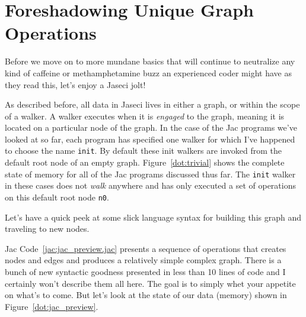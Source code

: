 \section{Foreshadowing Unique Graph Operations}
Before we move on to more mundane basics that will continue to neutralize any kind of caffeine or methamphetamine buzz an experienced \gls{coder} might have as they read this, let's enjoy a \gls{Jaseci jolt}!
\par
As described before, all data in Jaseci lives in either a graph, or within the scope of a \gls{walker}. A walker executes when it is \emph{engaged} to the graph, meaning it is located on a particular node of the graph. In the case of the Jac programs we've looked at so far, each program has specified one walker for which I've happened to choose the name \texttt{init}. By default these init walkers are invoked from the default root node of an empty graph. Figure~\ref{dot:trivial} shows the complete state of memory for all of the Jac programs discussed thus far. The \texttt{init} walker in these cases does not \emph{walk} anywhere and has only executed a set of operations on this default root node \texttt{n0}.
\par
Let's have a quick peek at some slick language syntax for building this graph and traveling to new nodes.
\par
{}
\par
{}
Jac Code~\ref{jac:jac_preview.jac} presents a sequence of operations that creates nodes and edges and produces a relatively simple complex graph. There is a bunch of new syntactic goodness presented in less than 10 lines of code and I certainly won't describe them all here. The goal is to simply whet your appetite on what's to come. But let's look at the state of our data (memory) shown in Figure~\ref{dot:jac_preview}.


